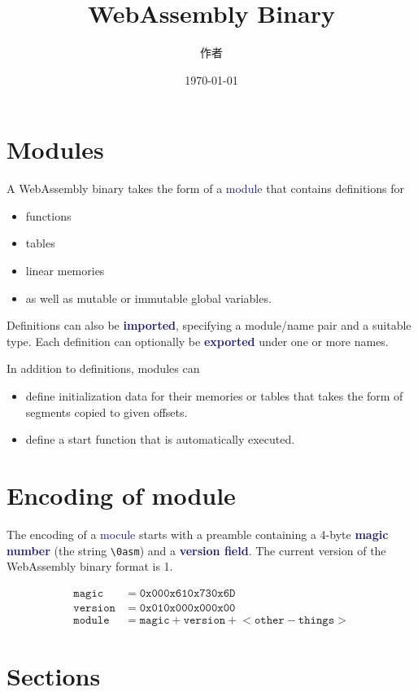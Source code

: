 \documentclass[dvipsnames]{article}
\title{WebAssembly Binary}
\date{\today}
\author{作者}
\newcommand{\mycola}{MidnightBlue}
\newcommand{\mycolb}{Mahogany}
\newcommand{\cola}[1]{\textcolor{\mycola}{#1}}
\newcommand{\colb}[1]{\textcolor{\mycolb}{#1}}
\newcommand{\Cola}[1]{\textcolor{\mycola}{\textbf{#1}}}
\begin{document}
\maketitle{}

\section{Modules}

A WebAssembly binary takes the form of a \cola{module} that contains \colb{definitions} for
\begin{itemize}
\item functions
\item tables
\item linear memories
\item as well as mutable or immutable global variables.
\end{itemize}

\colb{Definitions} can also be \Cola{imported}, specifying a module/name pair
and a suitable type. Each \colb{definition} can optionally be \Cola{exported}
under one or more names.

In addition to definitions, modules can

\begin{itemize}
\item define initialization data for their memories or tables that takes the
  form of segments copied to given offsets.
\item define a start function that is automatically executed.
\end{itemize}

\section{Encoding of module}


The encoding of a \cola{mocule} starts with a preamble containing a 4-byte
\Cola{magic number} (the string \verb|\0asm|) and a \Cola{version field}. The
current version of the WebAssembly binary format is 1.

\begin{align*}
  \mathtt{magic} &= \mathtt{0x00 0x61 0x73 0x6D} \\
  \mathtt{version} &= \mathtt{0x01 0x00 0x00 0x00} \\
  \mathtt{module} &= \mathtt{magic} + \mathtt{version} + \mathtt{<other-things>}
\end{align*}

\section{Sections}
\end{document}
